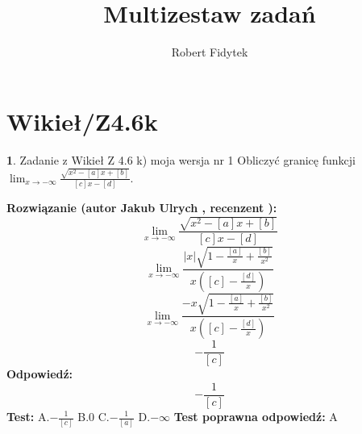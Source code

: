 \documentclass[12pt, a4paper]{article}
\title{Multizestaw zadań}
\author{Robert Fidytek}
\date{}
\theoremstyle{definition} %
\newtheorem{zad}{}
\newcommand{\kategoria}[1]{\section{#1}} %
\newcommand{\zadStart}[1]{\begin{zad}#1\newline} %
\newcommand{\zadStop}{\end{zad}}   %
\newcommand{\rozwStart}[2]{\noindent \textbf{Rozwiązanie (autor #1 , recenzent #2): }\newline} %
\newcommand{\rozwStop}{\newline}                                            %
\newcommand{\odpStart}{\noindent \textbf{Odpowiedź:}\newline}    %
\newcommand{\odpStop}{\newline}                                             %
\newcommand{\testStart}{\noindent \textbf{Test:}\newline} %
\newcommand{\testStop}{\newline} %
\newcommand{\kluczStart}{\noindent \textbf{Test poprawna odpowiedź:}\newline} %
\newcommand{\kluczStop}{\newline} %
\begin{document}
\maketitle


\kategoria{Wikieł/Z4.6k}
\zadStart{Zadanie z Wikieł Z 4.6 k) moja wersja nr 1}
Obliczyć granicę funkcji $\lim_{x \to -\infty}\frac{\sqrt{x^{2}-[a]x+[b]}}{[c]x-[d]}$.
\zadStop
\rozwStart{Jakub Ulrych}{}
$$\lim_{x \to -\infty}\frac{\sqrt{x^{2}-[a]x+[b]}}{[c]x-[d]}$$
$$\lim_{x \to -\infty}\frac{|x|\sqrt{1-\frac{[a]}{x}+\frac{[b]}{x^{2}}}}{x([c]-\frac{[d]}{x})}$$
$$\lim_{x \to -\infty}\frac{-x\sqrt{1-\frac{[a]}{x}+\frac{[b]}{x^{2}}}}{x([c]-\frac{[d]}{x})}$$
$$-\frac{1}{[c]}$$
\rozwStop
\odpStart
$$-\frac{1}{[c]}$$
\odpStop
\testStart
A.$-\frac{1}{[c]}$
B.$0$
C.$-\frac{1}{[a]}$
D.$-\infty$
\testStop
\kluczStart
A
\kluczStop
\end{document}
